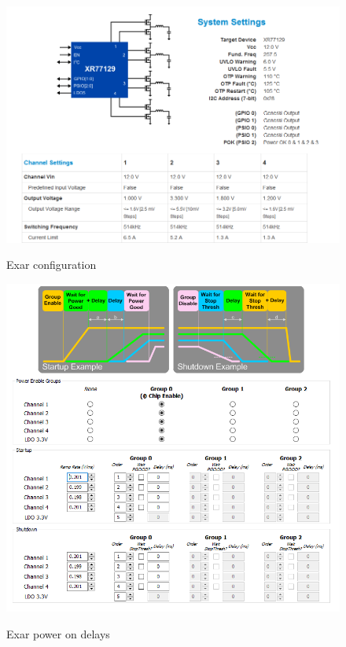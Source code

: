 	\begin{figure}[htbp!]
		\centering
		\includegraphics[scale=0.5]{img/exar1.png}\\
		\caption{Exar configuration} \label{exar1}
	\end{figure}
\clearpage	
	\begin{figure}[htbp!]
		\centering
		\includegraphics[scale=0.5]{img/exar2.png}\\
		\caption{Exar power on delays} \label{exar2}
	\end{figure}	
	



